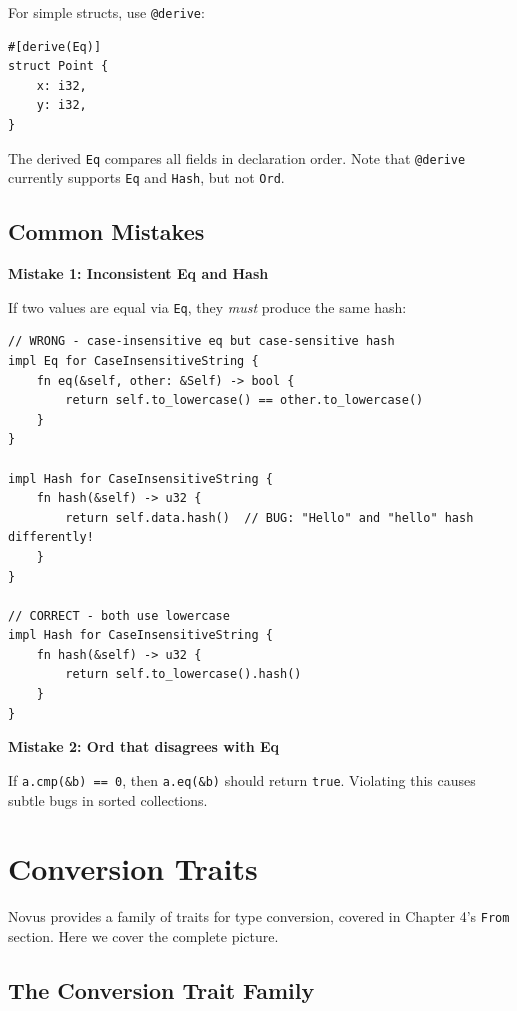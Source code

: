For simple structs, use \texttt{@derive}:

\begin{lstlisting}
#[derive(Eq)]
struct Point {
    x: i32,
    y: i32,
}
\end{lstlisting}

The derived \texttt{Eq} compares all fields in declaration order. Note that \texttt{@derive} currently supports \texttt{Eq} and \texttt{Hash}, but not \texttt{Ord}.

\subsection{Common Mistakes}

\textbf{Mistake 1: Inconsistent Eq and Hash}

If two values are equal via \texttt{Eq}, they \emph{must} produce the same hash:

\begin{lstlisting}
// WRONG - case-insensitive eq but case-sensitive hash
impl Eq for CaseInsensitiveString {
    fn eq(&self, other: &Self) -> bool {
        return self.to_lowercase() == other.to_lowercase()
    }
}

impl Hash for CaseInsensitiveString {
    fn hash(&self) -> u32 {
        return self.data.hash()  // BUG: "Hello" and "hello" hash differently!
    }
}

// CORRECT - both use lowercase
impl Hash for CaseInsensitiveString {
    fn hash(&self) -> u32 {
        return self.to_lowercase().hash()
    }
}
\end{lstlisting}

\textbf{Mistake 2: Ord that disagrees with Eq}

If \texttt{a.cmp(\&b) == 0}, then \texttt{a.eq(\&b)} should return \texttt{true}. Violating this causes subtle bugs in sorted collections.


\section{Conversion Traits}
\label{sec:conversion-traits}

Novus provides a family of traits for type conversion, covered in Chapter 4's \texttt{From} section. Here we cover the complete picture.

\subsection{The Conversion Trait Family}

